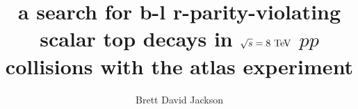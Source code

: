 \title{a search for b-l r-parity-violating scalar top decays
  in $\sqrt{s} = 8 \TeV$ $pp$ collisions with the atlas experiment}
    
\author{Brett David Jackson}

\newcommand{\adviser}{Evelyn Thomson, Associate Professor, Physics}
\newcommand{\advisershort}{Evelyn Thomson}

\newcommand{\myinstitution}{The University of Pennsylvania}

\newcommand{\chairperson}{Marija Drndic, Professor, Physics}

\newcommand{\committeeOne}{I. Joseph Kroll, Professor, Physics}
\newcommand{\committeeTwo}{H.H. Williams, Professor, Physics}
\newcommand{\committeeThree}{Burt Ovrut, Professor, Physics}
\newcommand{\committeeFour}{--}




